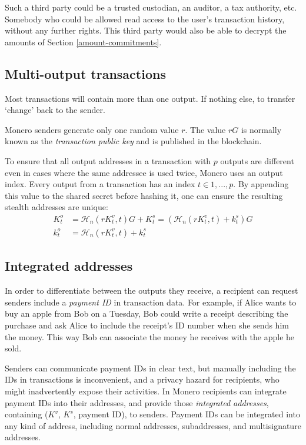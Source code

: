 Such a third party could be a trusted custodian, an auditor, a tax authority, etc. Somebody who could be allowed read access to the user’s transaction history, without any further rights. This third party would also be able to decrypt the amounts of Section \ref{amount-commitments}.

\newpage
\subsection{Multi-output transactions}
\label{sec:multi_out_transactions}

Most transactions will contain more than one output. If nothing else, to transfer `change’ back to the sender.

Monero senders generate only one random value $r$. The value $r G$ is normally known as the {\em transaction public key} and is published in the blockchain.

To ensure that all output addresses in a transaction with $p$ outputs are different even in cases where the same addressee is used twice, Monero uses an output index. Every output from a transaction has an index $t \in {1, ..., p}$. By appending this value to the shared secret before hashing it, one can ensure the resulting stealth addresses are unique:\\
\begin{align*}
  K_t^o &= \mathcal{H}_n(r K_t^v, t)G + K_t^s = (\mathcal{H}_n(r K_t^v, t) + k_t^s)G  \\ 
  k_t^o &= \mathcal{H}_n(r K_t^v, t) + k_t^s
\end{align*} 

\iffalse
\subsection{Integrated addresses}
\label{sec:integrated-addresses}

In order to differentiate between the outputs they receive, a recipient can request senders include a {\em payment ID} in transaction data. For example, if Alice wants to buy an apple from Bob on a Tuesday, Bob could write a receipt describing the purchase and ask Alice to include the receipt's ID number when she sends him the money. This way Bob can associate the money he receives with the apple he sold.

Senders can communicate payment IDs in clear text, but manually including the IDs in transactions is inconvenient, and a privacy hazard for recipients, who might inadvertently expose their activities. In Monero recipients can integrate payment IDs into their addresses, and provide those {\em integrated addresses}, containing ($K^v$, $K^s$, payment ID), to senders. Payment IDs can be integrated into any kind of address, including normal addresses, subaddresses, and multisignature addresses.

